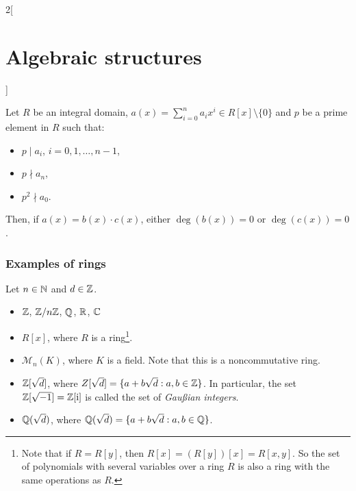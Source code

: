 \documentclass[../../../main.tex]{subfiles}
\begin{document}
\begin{multicols}{2}[\section{Algebraic structures}]
\begin{theorem}
\end{theorem}
\begin{theorem}
    Let $R$ be an integral domain, $a(x)=\sum_{i=0}^na_ix^i\in R[x]\setminus\{0\}$ and $p$ be a prime element in $R$ such that:
    \begin{itemize}
        \item $p\mid a_i$, $i=0,1,\ldots,n-1$,
        \item $p\nmid a_n$,
        \item $p^2\nmid a_0$.
    \end{itemize}
    Then, if $a(x)=b(x)\cdot c(x)$, either $\deg(b(x))=0$ or $\deg(c(x))=0$.
\end{theorem}
\subsubsection{Examples of rings}\label{AS-examples2}
Let $n\in\mathbb{N}$ and $d\in\mathbb{Z}$.
\begin{itemize}
    \item $\mathbb{Z}$, $\mathbb{Z}/n\mathbb{Z}$, $\mathbb{Q}$, $\mathbb{R}$, $\mathbb{C}$
    \item $R[x]$, where $R$ is a ring\footnote{Note that if $R=R[y]$, then $R[x]=(R[y])[x]=R[x,y]$. So the set of polynomials with several variables over a ring $R$ is also a ring with the same operations as $R$.}.
    \item $\mathcal{M}_n(K)$, where $K$ is a field. Note that this is a noncommutative ring.
    \item $\mathbb{Z}[\sqrt{d}]$, where $Z[\sqrt{d}]=\{a+b\sqrt{d}:a,b\in\mathbb{Z}\}$. In particular, the set $\mathbb{Z}[\sqrt{-1}]=\mathbb{Z}[\mathrm{i}]$ is called the set of \textit{Gau\ss ian integers}.
    \item $\mathbb{Q}(\sqrt{d})$, where $\mathbb{Q}(\sqrt{d})=\{a+b\sqrt{d}:a,b\in\mathbb{Q}\}$.
\end{itemize}

\end{multicols}
\end{document}
